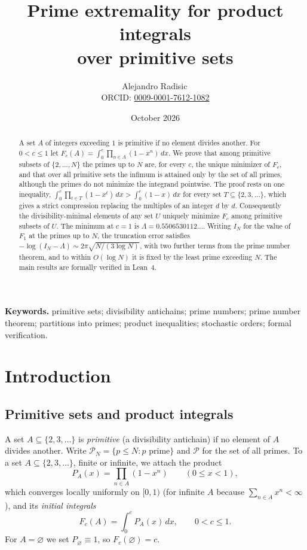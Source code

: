 \documentclass[11pt]{article}
\title{Prime extremality for product integrals\\ over primitive sets}
\author{Alejandro Radisic\,\orcidlink{0009-0001-7612-1082}\\[2pt] {\small ORCID: \href{https://orcid.org/0009-0001-7612-1082}{0009-0001-7612-1082}}}
\date{October 2026}
\theoremstyle{remark}
\newcommand{\Prm}{\mathcal{P}}
\begin{document}
\maketitle

\begin{abstract}
A set $A$ of integers exceeding $1$ is primitive if no element divides
another. For $0<c\le1$ let $F_c(A)=\int_0^c\prod_{n\in A}(1-x^n)\,dx$.
We prove that among primitive subsets of $\{2,\dots,N\}$ the primes up
to $N$ are, for every $c$, the unique minimizer of $F_c$, and that over
all primitive sets the infimum is attained only by the set of all
primes, although the primes do not minimize the integrand pointwise. The
proof rests on one inequality,
$\int_0^c\prod_{t\in T}(1-x^t)\,dx>\int_0^c(1-x)\,dx$ for every set
$T\subseteq\{2,3,\dots\}$, which gives a strict compression replacing
the multiples of an integer $d$ by $d$. Consequently the
divisibility-minimal elements of any set $U$ uniquely minimize $F_c$
among primitive subsets of $U$. The minimum at $c=1$ is
$\Lambda=0.5506530112\ldots$. Writing $I_N$ for the value of $F_1$ at
the primes up to $N$, the truncation error satisfies
$-\log(I_N-\Lambda)\sim2\pi\sqrt{N/(3\log N)}$, with two further terms
from the prime number theorem, and to within $O(\log N)$ it is fixed by
the least prime exceeding $N$. The main results are formally verified
in Lean~4.
\end{abstract}

\noindent\textbf{Keywords.} primitive sets; divisibility antichains;
prime numbers; prime number theorem; partitions into primes; product
inequalities; stochastic orders; formal verification.

\section{Introduction}\label{sec:intro}

\subsection{Primitive sets and product integrals}
A set $A\subseteq\{2,3,\dots\}$ is \emph{primitive} (a divisibility
antichain) if no element of $A$ divides another. Write
$\Prm_N=\{p\le N:p\text{ prime}\}$ and $\Prm$ for the set of all
primes. To a set $A\subseteq\{2,3,\dots\}$, finite or infinite, we
attach the product
\[
  P_A(x)=\prod_{n\in A}(1-x^n)\qquad(0\le x<1),
\]
which converges locally uniformly on $[0,1)$ (for infinite $A$ because
$\sum_{n\in A}x^n<\infty$), and its \emph{initial integrals}
\[
  F_c(A)=\int_0^cP_A(x)\,dx,\qquad 0<c\le1 .
\]
For $A=\varnothing$ we set $P_\varnothing\equiv1$, so
$F_c(\varnothing)=c$.
\end{document}
